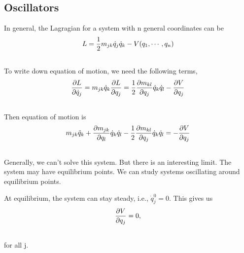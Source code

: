 \documentclass[letterpaper,10pt,english]{sphinxmanual}
\begin{document}
\subsection{Oscillators}
\label{ClassicalMechanics:oscillators}
In general, the Lagragian for a system with n general coordinates can be
\begin{gather}
\begin{split}L = \frac{1}{2} m _ {jk} \dot q_j \dot q_k - V(q_1, \cdots, q_n)\end{split}\notag\\\begin{split}\end{split}\notag
\end{gather}
To write down equation of motion, we need the following terms,
\begin{gather}
\begin{split}\frac{\partial L}{\partial \dot q_j} = m_{jk} \dot q_k
\frac{\partial L}{\partial q_j} = \frac{1}{2} \frac{\partial m_{kl}}{\partial q_j} \dot q_k \dot q_l - \frac{\partial V}{\partial q_j}\end{split}\notag\\\begin{split}\end{split}\notag
\end{gather}
Then equation of motion is
\begin{gather}
\begin{split}m_{jk} \ddot q_{k} + \frac{\partial m_{jk}}{\partial q_l} \dot q_k \dot q_l - \frac{1}{2} \frac{\partial m_{kl}}{\partial q_j} \dot q_k \dot q_l = - \frac{\partial V}{\partial q_j}\end{split}\notag\\\begin{split}\end{split}\notag
\end{gather}
Generally, we can't solve this system. But there is an interesting limit. The system may have equilibrium points. We can study systems oscillating around equilibrium points.

At equilibrium, the system can stay steady, i.e., $\dot q_j^0 = 0$. This gives us
\begin{gather}
\begin{split}\frac{\partial V}{\partial q_j} = 0 ,\end{split}\notag\\\begin{split}\end{split}\notag
\end{gather}
for all j.
\end{document}
